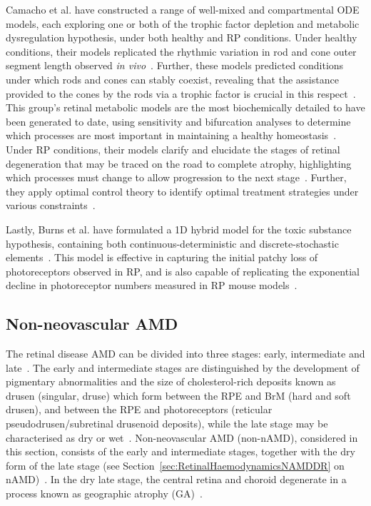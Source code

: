 \documentclass{article}
\begin{document}
Camacho et al. have constructed a range of well-mixed and compartmental ODE models, each exploring one or both of the trophic factor depletion and metabolic dysregulation hypothesis, under both healthy and RP conditions. Under healthy conditions, their models replicated the rhythmic variation in rod and cone outer segment length observed \emph{in vivo}~\cite{Camacho_et_al_2010,Camacho_et_al_2016b,Colon_Velez_et_al_2003, Wifvat_et_al_2021}. Further, these models predicted conditions under which rods and cones can stably coexist, revealing that the assistance provided to the cones by the rods via a trophic factor is crucial in this respect~\cite{Camacho_et_al_2010,Camacho_et_al_2016b,Colon_Velez_et_al_2003, Wifvat_et_al_2021}. This group’s retinal metabolic models are the most biochemically detailed to have been generated to date, using sensitivity and bifurcation analyses to determine which processes are most important in maintaining a healthy homeostasis~\cite{Aparicio_et_al_2022,Dobreva_et_al_2022,Camacho_et_al_2019,Camacho_et_al_2021a}. Under RP conditions, their models clarify and elucidate the stages of retinal degeneration that may be traced on the road to complete atrophy, highlighting which processes must change to allow progression to the next stage~\cite{Camacho_and_Wirkus_2013,Camacho_et_al_2016,Camacho_et_al_2016c}. Further, they apply optimal control theory to identify optimal treatment strategies under various constraints~\cite{Camacho_et_al_2014,Camacho_et_al_2020}.

Lastly, Burns et al. have formulated a 1D hybrid model for the toxic substance hypothesis, containing both continuous-deterministic and discrete-stochastic elements~\cite{Burns_et_al_2002}. This model is effective in capturing the initial patchy loss of photoreceptors observed in RP, and is also capable of replicating the exponential decline in photoreceptor numbers measured in RP mouse models~\cite{Clarke_et_al_2000}.
%
\subsection{Non-neovascular AMD}\label{Sec_non-nAMD}
%
The retinal disease AMD can be divided into three stages: early, intermediate and late~\cite{Ferris_et_al_2013}. The early and intermediate stages are distinguished by the development of pigmentary abnormalities and the size of cholesterol-rich deposits known as drusen (singular, druse) which form between the RPE and BrM (hard and soft drusen), and between the RPE and photoreceptors (reticular pseudodrusen/subretinal drusenoid deposits), while the late stage may be characterised as dry or wet~\cite{Coleman_et_al_2008,Ferris_et_al_2013,Jager_2008,Wu_et_al_2022}. Non-neovascular AMD (non-nAMD), considered in this section, consists of the early and intermediate stages, together with the dry form of the late stage (see Section~\ref{sec:RetinalHaemodynamicsNAMDDR} on nAMD)~\cite{Ferris_et_al_2013}. In the dry late stage, the central retina and choroid degenerate in a process known as geographic atrophy (GA)~\cite{Coleman_et_al_2008,Jager_2008,Ly_et_al_2016}.
\end{document}
